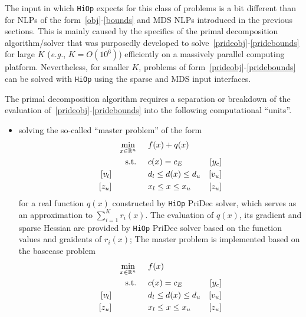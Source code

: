 \documentclass[11pt]{article}
\newcommand{\Hi}{\texttt{HiOp}\xspace}
\begin{document}
The input in which \Hi expects for this class of problems is a bit different than for NLPs of the form~\eqref{obj}-\eqref{bounds} and MDS NLPs introduced in the previous sections. This is mainly caused by the specifics of the primal decomposition algorithm/solver that was purposedly developed to solve~\eqref{prideobj}-\eqref{pridebounds} for large $K$ (\textit{e.g.}, $K=O(10^6)$) efficiently on a massively parallel computing platform. Nevertheless, for smaller $K$, problems of form~\eqref{prideobj}-\eqref{pridebounds} can be solved with \Hi using the sparse and MDS input interfaces.

The primal decomposition algorithm requires a separation or breakdown of the evaluation of~\eqref{prideobj}-\eqref{pridebounds} into the following computational ``units''.
\begin{itemize}
\item[1.] solving the so-called ``master problem'' of the form
  \begin{align}
&&&&\min_{x\in\mathbb{R}^n} & \hspace{0.5cm} f(x) + q(x) &&&& \label{pridemobj}\\
&&&&\textnormal{s.t.} &\hspace{0.5cm}  c(x)=c_E &[y_c]&&&\\
&&[v_l]&&& \hspace{0.5cm} d_l \leq d(x) \leq d_u  &[v_u]&&&\label{pridemineq} \\
&&[z_u]&&& \hspace{0.5cm} x_l \leq x \leq x_u & [z_u] &&&\label{pridembounds}
  \end{align}
for a real function $q(x)$ constructed by \Hi PriDec solver, which serves as an approximation to $\sum_{i=1}^K r_i(x)$. The evaluation of $q(x)$, its gradient and sparse Hessian are provided by \Hi PriDec solver based on the function values and graidents of $r_i(x)$; 
The master problem is implemented based on the basecase problem
  \begin{align}
&&&&\min_{x\in\mathbb{R}^n} & \hspace{0.5cm} f(x) &&&& \label{pridembaseobj}\\
&&&&\textnormal{s.t.} &\hspace{0.5cm}  c(x)=c_E &[y_c]&&&\\
&&[v_l]&&& \hspace{0.5cm} d_l \leq d(x) \leq d_u  &[v_u]&&&\label{pridembaseineq} \\
&&[z_u]&&& \hspace{0.5cm} x_l \leq x \leq x_u & [z_u] &&&\label{pridembasebounds}

\end{align}
\end{itemize}
\end{document}
